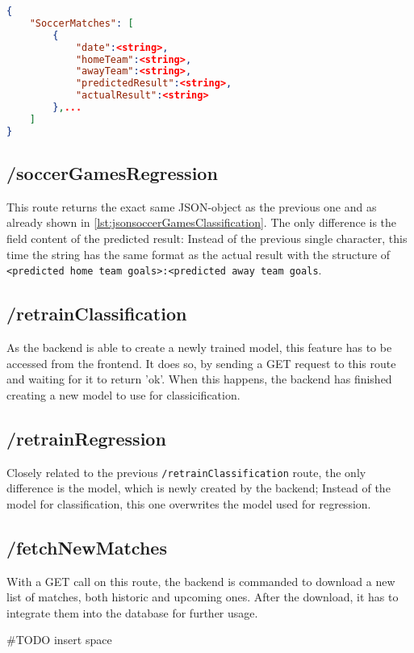 \begin{lstlisting}[language=JSON,label={lst:jsonsoccerGamesClassification}, caption=JSON structure of API call on /soccerGamesClassification]
{
    "SoccerMatches": [
        {
            "date":<string>,
            "homeTeam":<string>,
            "awayTeam":<string>,
            "predictedResult":<string>,
            "actualResult":<string>
        },...
    ]
}
\end{lstlisting}

\subsection{/soccerGamesRegression}
This route returns the exact same JSON-object as the previous one and as already shown in \ref{lst:jsonsoccerGamesClassification}. The only difference is the field content of the predicted result: Instead of the previous single character, this time the string has the same format as the actual result with the structure of \lstinline[columns=fixed]{<predicted home team goals>:<predicted away team goals}.

\subsection{/retrainClassification}
As the backend is able to create a newly trained model, this feature has to be accessed from the frontend. It does so, by sending a GET request to this route and waiting for it to return 'ok'. When this happens, the backend has finished creating a new model to use for classicification.

\subsection{/retrainRegression}
Closely related to the previous \lstinline[columns=fixed]{/retrainClassification} route, the only difference is the model, which is newly created by the backend; Instead of the model for classification, this one overwrites the model used for regression.

\subsection{/fetchNewMatches}
With a GET call on this route, the backend is commanded to download a new list of matches, both historic and upcoming ones. After the download, it has to integrate them into the database for further usage.

\#TODO insert space


